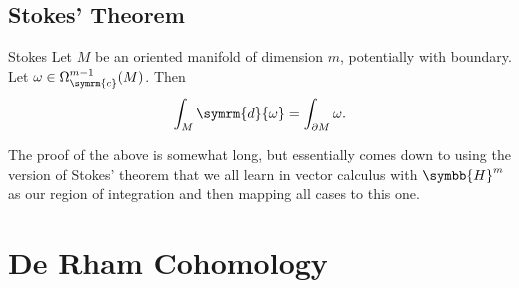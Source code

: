 \documentclass[fleqn]{NotesClass}
\renewcommand{\dl}{\symrm{d}}
\newcommand{\upperHalfSpace}{\symbb{H}}
\newcommand{\compact}{\symrm{c}}
\begin{document}
    \section{Stokes' Theorem}
    \begin{thm}{Stokes}{}
        Let \(M\) be an oriented manifold of dimension \(m\), potentially with boundary.
        Let \(\omega \in \Omega_{\compact}^{m - 1}(M)\).
        Then
        \begin{equation}
            \int_M \dl{\omega} = \int_{\partial M} \omega.
        \end{equation}
    \end{thm}
    
    The proof of the above is somewhat long, but essentially comes down to using the version of Stokes' theorem that we all learn in vector calculus with \(\upperHalfSpace^m\) as our region of integration and then mapping all cases to this one.
    
    \chapter{De Rham Cohomology}
    
    
    
%        
%
\end{document}
